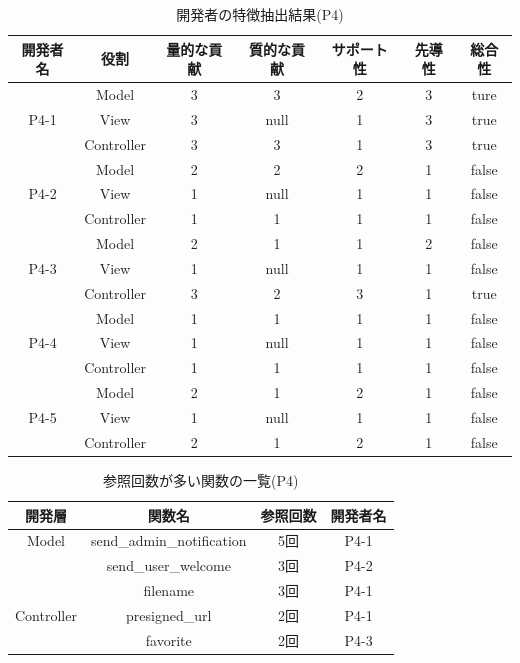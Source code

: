 \documentclass{funthesis}
\begin{document}
\begin{table}[H]
  \begin{center}
\begin{tabular}{|c|c|c|c|c|c|c|}
\hline
開発者名 & 役割 & 量的な貢献 & 質的な貢献 & サポート性 & 先導性 & 総合性\\ \hline
& Model & 3 & 3 & 2 & 3 & ture\\ \cline{2-7}
P4-1 & View & 3 & null & 1 & 3 & true\\ \cline{2-7}
& Controller & 3 & 3 & 1 & 3 & true \\ \hline \hline

& Model & 2 & 2 & 2 & 1 & false\\ \cline{2-7}
P4-2 & View & 1 & null & 1 & 1 & false\\ \cline{2-7}
& Controller & 1 & 1 & 1 & 1 & false \\ \hline \hline

& Model & 2 & 1 & 1 & 2 & false\\ \cline{2-7}
P4-3 & View & 1 & null& 1 & 1 & false\\ \cline{2-7}
& Controller & 3 & 2 & 3 & 1 & true \\ \hline \hline

& Model & 1 & 1 & 1 & 1 & false\\ \cline{2-7}
P4-4 & View & 1 & null& 1 & 1 & false\\ \cline{2-7}
& Controller & 1 & 1 & 1 & 1 & false \\ \hline \hline

& Model & 2 & 1 & 2 & 1 & false\\ \cline{2-7}
P4-5 & View & 1 & null & 1 & 1 & false\\ \cline{2-7}
& Controller & 2 & 1 & 2 & 1 & false \\ \hline
\end{tabular}
  \end{center}
  \caption{開発者の特徴抽出結果(P4)}    \label{sample}
\end{table}
\begin{table}[H]
  \begin{center}
\begin{tabular}{|c|c|c|c|}\hline
開発層&関数名&参照回数&開発者名\\ \hline
Model& send\_admin\_notification & 5回 & P4-1 \\ \cline{2-4}
& send\_user\_welcome & 3回 & P4-2 \\ \cline{2-4}\hline\hline

& filename & 3回 & P4-1 \\ \cline{2-4}
Controller& presigned\_url & 2回 & P4-1 \\ \cline{2-4}
& favorite & 2回 & P4-3 \\ \hline
\end{tabular}    
\caption{参照回数が多い関数の一覧(P4)}    \label{sample}
  \end{center}
\end{table}
\end{document}
